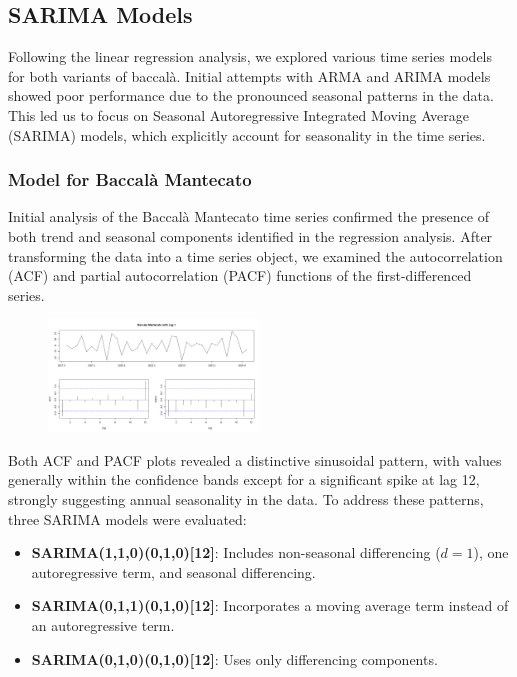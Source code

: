 \documentclass[10pt,twocolumn,letterpaper]{article}
\begin{document}
\subsection{SARIMA Models}
Following the linear regression analysis, we explored various time series models for both variants of baccalà. Initial attempts with ARMA and ARIMA models showed poor performance due to the pronounced seasonal patterns in the data. This led us to focus on Seasonal Autoregressive Integrated Moving Average (SARIMA) models, which explicitly account for seasonality in the time series.

\subsubsection{Model for Baccalà Mantecato}
Initial analysis of the Baccalà Mantecato time series confirmed the presence of both trend and seasonal components identified in the regression analysis. After transforming the data into a time series object, we examined the autocorrelation (ACF) and partial autocorrelation (PACF) functions of the first-differenced series. 

\begin{figure}[H]
    \centering
    \includegraphics[width=0.5\textwidth]{PlotsBEFD/ACF_MAN_LAG1.png} 
    \caption{}
    \label{fig:esempio}
\end{figure}

Both ACF and PACF plots revealed a distinctive sinusoidal pattern, with values generally within the confidence bands except for a significant spike at lag 12, strongly suggesting annual seasonality in the data.
To address these patterns, three SARIMA models were evaluated:
\begin{itemize}[noitemsep, topsep=0pt]
    \item \textbf{SARIMA(1,1,0)(0,1,0)[12]}: Includes non-seasonal differencing (\(d=1\)), one autoregressive term, and seasonal differencing.
    \item \textbf{SARIMA(0,1,1)(0,1,0)[12]}: Incorporates a moving average term instead of an autoregressive term.
    \item \textbf{SARIMA(0,1,0)(0,1,0)[12]}: Uses only differencing components.
\end{itemize}
\end{document}
